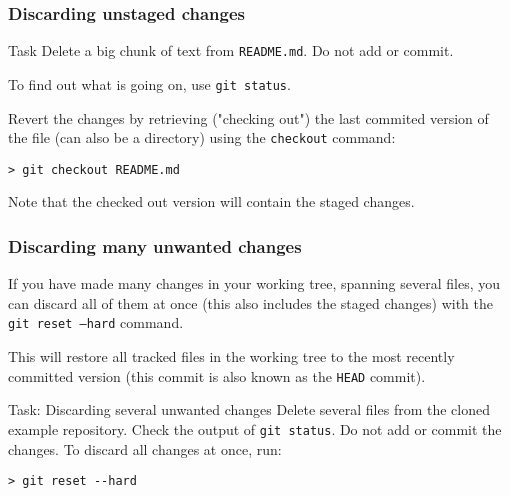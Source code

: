 \begin{frame}[fragile]
	\frametitle{Discarding unstaged changes}
	
	\begin{block}{Task}
	Delete a big chunk of text from \texttt{README.md}. Do not add or commit.
	\end{block}
	
	To find out what is going on, use \texttt{git status}.
	\bigskip
	
    Revert the changes by retrieving ("checking out") the last commited version of the file (can also be a directory) using the \texttt{checkout} command:

	\begin{verbatim}
> git checkout README.md
	\end{verbatim}
	
	Note that the checked out version will contain the staged changes.
\end{frame}
\begin{frame}[fragile]

\frametitle{Discarding many unwanted changes}

If you have made many changes in your working tree, spanning several files, you can discard all of them at once (this also includes the staged changes) with the \texttt{git reset --hard} command.

\medskip
This will restore all tracked files in the working tree to the most recently committed version (this commit is also known as the \texttt{HEAD} commit).

\begin{block}{Task: Discarding several unwanted changes}
Delete several files from the cloned example repository. Check the output of \texttt{git status}. Do not add or commit the changes. To discard all changes at once, run:
\begin{verbatim}
> git reset --hard
\end{verbatim}

\end{block}

\end{frame}



